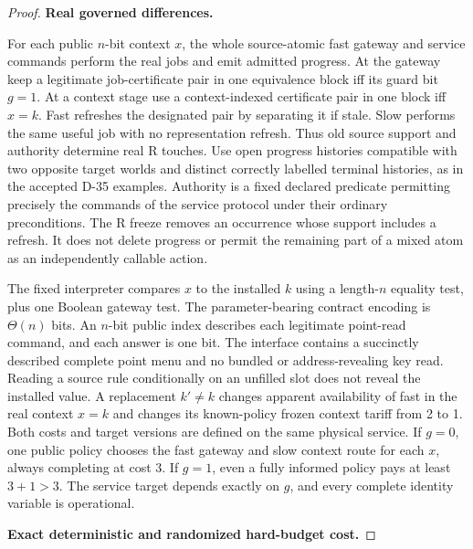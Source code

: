 \begin{proof}

\textbf{Real governed differences.}

For each public \(n\)-bit context \(x\), the whole source-atomic fast gateway and service commands perform the real jobs and emit admitted progress. At the gateway keep a legitimate job-certificate pair in one equivalence block iff its guard bit \(g=1\). At a context stage use a context-indexed certificate pair in one block iff \(x=k\). Fast refreshes the designated pair by separating it if stale. Slow performs the same useful job with no representation refresh. Thus old source support and authority determine real R touches. Use open progress histories compatible with two opposite target worlds and distinct correctly labelled terminal histories, as in the accepted D-35 examples. Authority is a fixed declared predicate permitting precisely the commands of the service protocol under their ordinary preconditions. The R freeze removes an occurrence whose support includes a refresh. It does not delete progress or permit the remaining part of a mixed atom as an independently callable action.

The fixed interpreter compares \(x\) to the installed \(k\) using a length-\(n\) equality test, plus one Boolean gateway test. The parameter-bearing contract encoding is \(\Theta(n)\) bits. An \(n\)-bit public index describes each legitimate point-read command, and each answer is one bit. The interface contains a succinctly described complete point menu and no bundled or address-revealing key read. Reading a source rule conditionally on an unfilled slot does not reveal the installed value. A replacement \(k'\ne k\) changes apparent availability of fast in the real context \(x=k\) and changes its known-policy frozen context tariff from 2 to 1. Both costs and target versions are defined on the same physical service. If \(g=0\), one public policy chooses the fast gateway and slow context route for each \(x\), always completing at cost 3. If \(g=1\), even a fully informed policy pays at least \(3+1>3\). The service target depends exactly on \(g\), and every complete identity variable is operational.

\textbf{Exact deterministic and randomized hard-budget cost.}


\end{proof}
